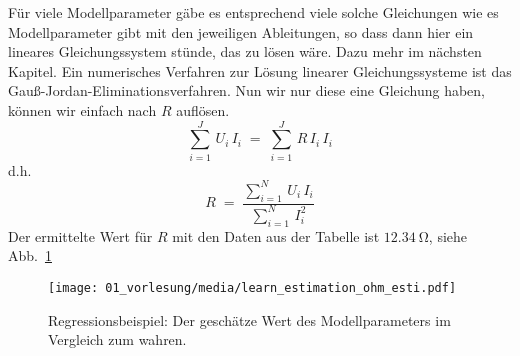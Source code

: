 Für viele Modellparameter gäbe es entsprechend viele solche Gleichungen wie es Modellparameter gibt
mit den jeweiligen Ableitungen, so dass
dann hier ein lineares Gleichungssystem stünde, das zu lösen wäre. Dazu mehr im nächsten Kapitel.
Ein numerisches Verfahren zur Lösung linearer Gleichungssysteme ist das Gauß-Jordan-Eliminationsverfahren.
Nun wir nur diese eine Gleichung haben, können wir einfach nach $R$ auflösen.
\begin{equation}
\sum_{i = 1}^J \, U_i \, I_i \; = \; \sum_{i = 1}^J \, R \, I_i \, I_i
\end{equation}
d.h.
\begin{equation}
 R \; = \; \frac{\sum\limits_{i = 1}^N \, U_i \, I_i}{\sum\limits_{i = 1}^N \,  I_i^2}
\end{equation}
Der ermittelte Wert für $R$ mit den Daten aus der Tabelle ist $12.34~\mathrm{\Omega}$, siehe Abb.~\ref{OhmResult}

\begin{figure}
\begin{center}
\texttt{[image: 01\_vorlesung/media/learn\_estimation\_ohm\_esti.pdf]}
\label{OhmResult}
\caption{Regressionsbeispiel: Der geschätze Wert des Modellparameters im Vergleich zum wahren.}
\end{center}
\end{figure}

